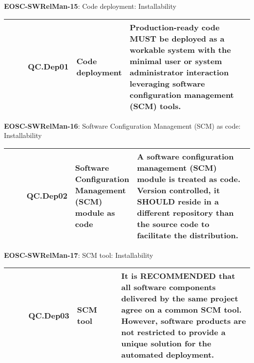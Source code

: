 \textbf{EOSC-SWRelMan-15}: Code deployment: Installability
\nopagebreak[4]
\begin{center}
    \tabletail{\hline}
    \tiny
    \begin{supertabular}{|p{0.10\linewidth}|p{0.10\linewidth}|p{0.20\linewidth}|p{0.60\linewidth}|} \hline
        \cite{orviz_set_2017} & QC.Dep01 & Code deployment & Production-ready code MUST be deployed as a workable system with the minimal user or system administrator interaction leveraging software configuration management (SCM) tools.\\ \hline
    \end{supertabular}
\end{center}

\textbf{EOSC-SWRelMan-16}: Software Configuration Management (SCM) as code: Installability
\nopagebreak[4]
\begin{center}
    \tabletail{\hline}
    \tiny
    \begin{supertabular}{|p{0.10\linewidth}|p{0.10\linewidth}|p{0.20\linewidth}|p{0.60\linewidth}|} \hline
        \cite{orviz_set_2017} & QC.Dep02 & Software Configuration Management (SCM) module as code & A software configuration management (SCM) module is treated as code. Version controlled, it SHOULD reside in a different repository than the source code to facilitate the distribution.\\ \hline
    \end{supertabular}
\end{center}

\textbf{EOSC-SWRelMan-17}: SCM tool: Installability
\nopagebreak[4]
\begin{center}
    \tabletail{\hline}
    \tiny
    \begin{supertabular}{|p{0.10\linewidth}|p{0.10\linewidth}|p{0.20\linewidth}|p{0.60\linewidth}|} \hline
        \cite{orviz_set_2017} & QC.Dep03 & SCM tool & It is RECOMMENDED that all software components delivered by the same project agree on a common SCM tool. However, software products are not restricted to provide a unique solution for the automated deployment.\\ \hline
    \end{supertabular}
\end{center}

